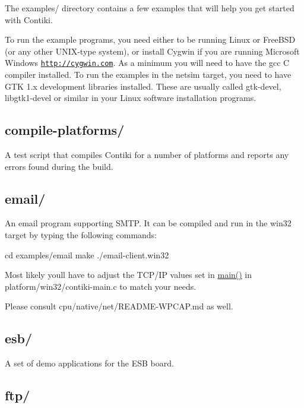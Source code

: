 The examples/ directory contains a few examples that will help you get started with Contiki.

To run the example programs, you need either to be running Linux or Free\+B\+S\+D (or any other U\+N\+I\+X-\/type system), or install Cygwin if you are running Microsoft Windows \href{http://cygwin.com}{\tt http\+://cygwin.\+com}. As a minimum you will need to have the gcc C compiler installed. To run the examples in the \textquotesingle{}netsim\textquotesingle{} target, you need to have G\+T\+K 1.\+x development libraries installed. These are usually called \textquotesingle{}gtk-\/devel\textquotesingle{}, \textquotesingle{}libgtk1-\/devel\textquotesingle{} or similar in your Linux software installation programs.

\subsection*{compile-\/platforms/ }

A test script that compiles Contiki for a number of platforms and reports any errors found during the build.

\subsection*{email/ }

An email program supporting S\+M\+T\+P. It can be compiled and run in the \textquotesingle{}win32\textquotesingle{} target by typing the following commands\+: \begin{DoxyVerb}cd examples/email
make
./email-client.win32
\end{DoxyVerb}


Most likely you\textquotesingle{}ll have to adjust the T\+C\+P/\+I\+P values set in \hyperlink{group__IPV6_ga0c99d968a34e803d378692bde2e3f18f}{main()} in platform/win32/contiki-\/main.\+c to match your needs.

Please consult cpu/native/net/\+R\+E\+A\+D\+M\+E-\/\+W\+P\+C\+A\+P.\+md as well.

\subsection*{esb/ }

A set of demo applications for the E\+S\+B board.

\subsection*{ftp/ }

